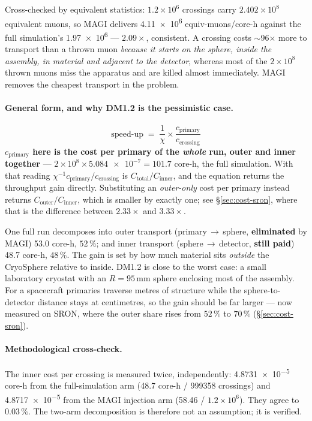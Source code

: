 \documentclass[11pt,a4paper]{article}
\begin{document}
Cross-checked by equivalent statistics: $1.2\times10^{6}$ crossings carry
$2.402\times10^{8}$ equivalent muons, so MAGI delivers \num{4.11e6}
equiv-muons/core-h against the full simulation's \num{1.97e6} ---
$2.09\times$, consistent. A crossing costs $\sim$96$\times$ more to transport
than a thrown muon \emph{because it starts on the sphere, inside the assembly,
in material and adjacent to the detector}, whereas most of the $2\times10^{8}$
thrown muons miss the apparatus and are killed almost immediately. MAGI removes
the cheapest transport in the problem.

\paragraph{General form, and why DM1.2 is the pessimistic case.}
\begin{equation}
\text{speed-up} \;=\; \frac{1}{\chi} \times
\frac{c_{\mathrm{primary}}}{c_{\mathrm{crossing}}}
\end{equation}
\textbf{$c_{\mathrm{primary}}$ here is the cost per primary of the
\emph{whole} run, outer and inner together} --- $2\times10^{8} \times
\num{5.084e-7} = 101.7$ core-h, the full simulation. With that reading
$\chi^{-1}c_{\mathrm{primary}}/c_{\mathrm{crossing}}$ is
$C_{\mathrm{total}}/C_{\mathrm{inner}}$, and the equation returns the throughput
gain directly. Substituting an \emph{outer-only} cost per primary instead
returns $C_{\mathrm{outer}}/C_{\mathrm{inner}}$, which is smaller by exactly
one; see \S\ref{sec:cost-sron}, where that is the difference between
$2.33\times$ and $3.33\times$.

One full run decomposes into outer transport (primary\,$\to$\,sphere,
\textbf{eliminated} by MAGI) 53.0 core-h, $52\,\%$; and inner transport
(sphere\,$\to$\,detector, \textbf{still paid}) 48.7 core-h, $48\,\%$. The gain
is set by how much material sits \emph{outside} the CryoSphere relative to
inside. DM1.2 is close to the worst case: a small laboratory cryostat with an
$R=95$\,mm sphere enclosing most of the assembly. For a spacecraft primaries
traverse metres of structure while the sphere-to-detector distance stays at
centimetres, so the gain should be far larger --- now measured on SRON, where
the outer share rises from $52\,\%$ to $70\,\%$ (\S\ref{sec:cost-sron}).

\paragraph{Methodological cross-check.} The inner cost per crossing is measured
twice, independently: \num{4.8731e-5} core-h from the full-simulation arm
(48.7 core-h / \num{999358} crossings) and \num{4.8717e-5} from the MAGI
injection arm (58.46 / $1.2\times10^{6}$). They agree to $0.03\,\%$. The
two-arm decomposition is therefore not an assumption; it is verified.
\end{document}
